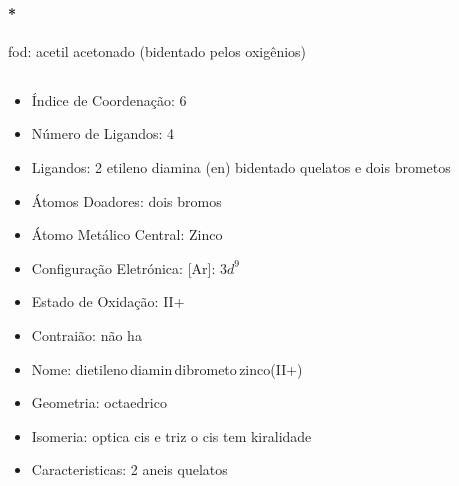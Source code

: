 \documentclass[12pt]{article}
\begin{document}
\paragraph{*}
fod: acetil acetonado  (bidentado pelos oxigênios)

\noindent\begin{minipage}{\textwidth}
	
	\subsection{\ch{[Zn(en)2Br2]}}
	\begin{itemize}
   
   \item Índice de Coordenação: 6
   
   \item Número de Ligandos: 4
   
   \item Ligandos: 
   	2 etileno diamina (en) bidentado quelatos
		e dois brometos 
   
   \item Átomos Doadores:
   	dois bromos
   
   \item Átomo Metálico Central:
   	Zinco
   
   \item Configuração Eletrónica:
		[Ar]: $3d^9$
		   
   \item Estado de Oxidação:
   	II+
   
   \item Contraião:
   	não ha
   
   \item Nome:
   	dietileno\,diamin\,dibrometo\,zinco(II+)
   
   \item Geometria:
   	octaedrico
   
   \item Isomeria:
		optica cis e triz
		o cis tem kiralidade
		
	\item Caracteristicas:
		2 aneis quelatos

	\end{itemize}
	
\end{minipage}
\end{document}
